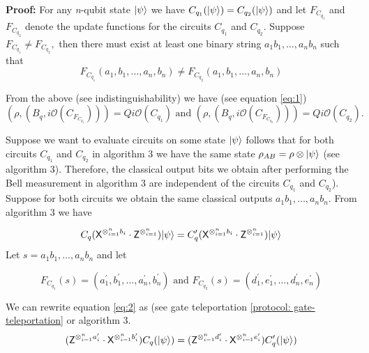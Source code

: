 \begin{flushleft}
{\bf Proof:} For any {\em n}-qubit state ${\lvert}\psi\rangle$ we have $C_{q_1}({\lvert}\psi\rangle)=C_{q_2}({\lvert}\psi\rangle)$ and let $F_{C_{q_1}}$ and $F_{C_{q_2}}$ denote the update functions for the circuits $C_{q_1}$ and $C_{q_2}.$ Suppose $F_{C_{q_1}}\neq F_{C_{q_2}},$  then there must exist at least one binary string $a_1b_1,\ldots, a_nb_n$ such that 
\begin{equation*}
F_{C_{q_1}}(a_1,b_1,\ldots,a_n,b_n)\neq F_{C_{q_2}}(a_1,b_1,\ldots,a_n,b_n)
\end{equation*}

From the above (see indistinguishability) we have (see equation \ref{eq:1})
\begin{equation*}
\left(\rho ,\left(B_q, i\mathcal{O}(C_{F_{C_{q_1}}})\right)\right)= Qi\mathcal{O}(C_{q_1}) \mbox{ and } \left(\rho ,\left(B_q, i\mathcal{O}(C_{F_{C_{q_2}}})\right)\right)= Qi\mathcal{O}(C_{q_2}).
\end{equation*}

Suppose we want to evaluate circuits on some state ${\lvert}\psi\rangle$ follows that for both circuits $C_{q_1}$ and $C_{q_2}$ in algorithm 3 we have the same state $\rho_{AB}=\rho\otimes {\lvert}\psi\rangle$ (see algorithm 3). Therefore, the classical output bits we obtain after performing the Bell measurement in algorithm 3 are independent of the circuits $C_{q_1}$ and $C_{q_2}$). Suppose for both circuits we obtain the same classical outputs $a_1b_1,\ldots, a_nb_n.$ From algorithm 3 we have 
 
 \begin{equation}
  \label{eq:2}
C_q({\sf X}^{\otimes_{i=1}^{n} b_{i}} \cdot {\sf Z}^{\otimes_{i=1}^{n}}){\lvert}\psi\rangle=C_q^\prime ({\sf X}^{\otimes_{i=1}^{n} b_{i}} \cdot {\sf Z}^{\otimes_{i=1}^{n}}){\lvert}\psi\rangle
\end{equation}
Let $s=a_1b_1,\ldots, a_nb_n$ and let 

 \begin{equation}
 \label{eq:3}
F_{C_{q_1}}(s)=(a^\prime_1,b^\prime_1,\ldots, a^\prime_n,b^\prime_n) \mbox{ and } F_{C_{q_2}}(s)=(d_1^\prime,e_1^\prime,\ldots, d_n^\prime,e^\prime_n)
\end{equation}

We can rewrite equation \ref{eq:2} as (see gate teleportation \ref{protocol: gate-teleportation} or algorithm 3.
 \begin{equation}
  \label{eq:4}
({\sf Z}^{\otimes_{i=1}^{n} a_{i}^\prime} \cdot {\sf X}^{\otimes_{i=1}^{n} b_{i}^\prime})C_q({\lvert}\psi\rangle)=({\sf Z}^{\otimes_{i=1}^{n} d_{i}^\prime} \cdot {\sf X}^{\otimes_{i=1}^{n} e_{i}^\prime})C_q^\prime({\lvert}\psi\rangle)
\end{equation}


\end{flushleft}
